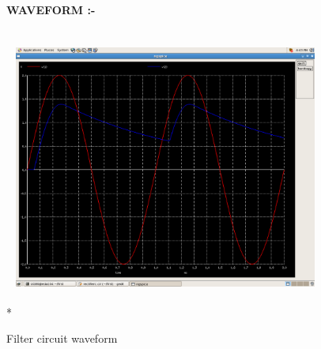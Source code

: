 \documentclass{article}
\begin{document}
\begin{flushleft}
\begin{figure}[ht] 
\large{{\bf\textcolor{rosewood}{ WAVEFORM} :-}}\vspace{5mm} \\*
\includegraphics[width=10cm, height=10cm]{filter.png} 
\caption{Filter circuit waveform}
\label{fig:circuit4} 
\end{figure} 
\end{flushleft}
\newpage
\end{document}
